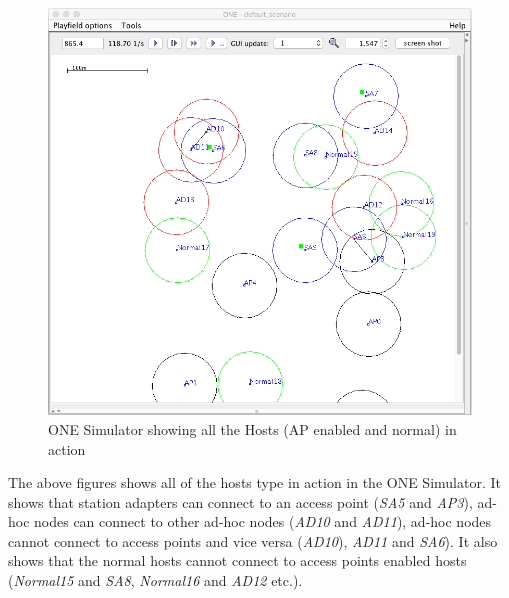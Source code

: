 	\begin{figure}[H]
		\centering
		\includegraphics[scale=0.42]{./figures/aps-2}
		\caption{ONE Simulator showing all the Hosts (AP enabled and normal) in action}
	\end{figure}
The above figures shows all of the hosts type in action in the ONE Simulator. It shows that station adapters can connect to an access point (\textit{SA5} and \textit{AP3}), ad-hoc nodes can connect to other ad-hoc nodes (\textit{AD10} and \textit{AD11}), ad-hoc nodes cannot connect to access points and vice versa (\textit{AD10}), \textit{AD11} and \textit{SA6}). It also shows that the normal hosts cannot connect to access points enabled hosts (\textit{Normal15} and \textit{SA8}, \textit{Normal16} and \textit{AD12} etc.).\newline
